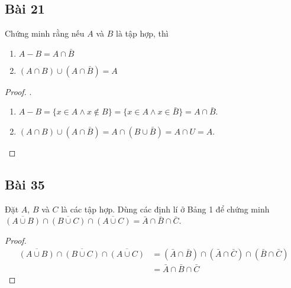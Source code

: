 \subsection*{Bài 21}
Chứng minh rằng nếu $A$ và $B$ là tập hợp, thì
\begin{enumerate}[label=\alph*)]
    \item $A-B=A\cap\bar B$
    \item $(A\cap B)\cup(A\cap\bar B)=A$
\end{enumerate}
\begin{proof}.
    \begin{enumerate}[label=\alph*)]
        \item $A-B=\{x\in A\land x\notin B\}=\{x\in A\land x\in\bar B\}=A\cap\bar B$.
        \item $(A\cap B)\cup(A\cap\bar B)=A\cap(B\cup\bar B)=A\cap U=A$.
    \end{enumerate}
\end{proof}
\subsection*{Bài 35}
Đặt $A$, $B$ và $C$ là các tập hợp. Dùng các định lí ở Bảng 1 để chứng minh $\overline{(A\cup B)}\cap\overline{(B\cup C)}\cap\overline{(A\cup C)}=\bar A\cap\bar B\cap\bar C$.
\begin{proof}
    \begin{align*}
        \overline{(A\cup B)}\cap\overline{(B\cup C)}\cap\overline{(A\cup C)}&=(\bar A\cap\bar B)\cap(\bar A\cap\bar C)\cap(\bar B\cap\bar C)\\
        &=\bar A\cap\bar B\cap\bar C
    \end{align*}
\end{proof}
